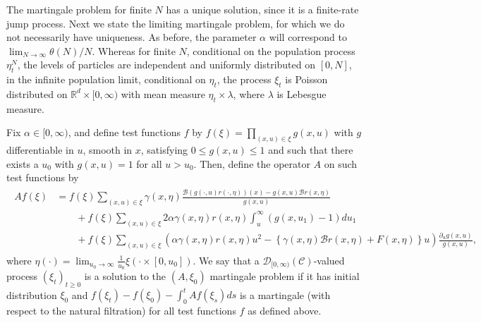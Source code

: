 \documentclass[EJP]{ejpecp} %
\newcommand{\IR}{\mathbb R}
\newcommand{\DG}{\mathcal{B}}  %
\newcommand{\lp}{\xi}              %
\begin{document}
The martingale problem for finite $N$ has a unique solution, 
since it is a finite-rate jump process.
Next we state the limiting martingale problem,
for which we do not necessarily have uniqueness.
As before, the parameter $\alpha$ will correspond to 
$\lim_{N\to\infty}\theta(N)/N$. Whereas for finite $N$, conditional
on the population process $\eta_t^N$, the levels of particles are
independent and 
uniformly distributed on $[0,N]$, in the infinite population limit, 
conditional on $\eta_t$, the process $\xi_t$ is Poisson distributed on 
$\IR^d\times [0,\infty)$ with mean measure $\eta_t\times\lambda$, where 
$\lambda$ %
is Lebesgue measure.

\begin{definition}
    \label{defn:limiting_lookdown_mgale}
    Fix $\alpha \in [0, \infty)$, and define  
    test functions $f$ by 
    $f(\xi) = \prod_{(x, u) \in \xi} g(x, u)$ 
	with $g$ differentiable in $u$, smooth in $x$, satisfying 
$0\leq g(x,u)\leq 1$ and
    such that there exists a $u_0$ with $g(x, u) = 1$ for all $u > u_0$.
    Then, define the operator $A$ on such test functions by 
    \begin{align} \begin{split} \label{eqn:limiting_lookdown_generator}
    A f(\lp)
    &=
        f(\lp)  \sum_{(x, u) \in \xi}
        \gamma(x, \eta)
            \frac{
                \DG(g(\cdot, u) r(\cdot, \eta))(x) - g(x,u) \DG r(x,\eta)
            }{
                g(x, u)
            }
    \\ &\qquad {} +
        f(\lp) \sum_{(x, u) \in \xi}
        2 \alpha \gamma(x, \eta) r(x, \eta) \int_u^\infty (g(x, u_1) - 1) du_1
    \\ &\qquad {} +
        f(\lp) \sum_{(x, u) \in \xi}
        \left(
            \alpha \gamma(x, \eta) r(x, \eta) u^2
            -
            \left\{
                \gamma(x, \eta) \DG r(x, \eta) + F(x, \eta)
            \right\} u
        \right)
        \frac{\partial_u g(x, u)}{ g(x,u) }  ,
    \end{split} \end{align}
    where $\eta(\cdot) = \lim_{u_0 \to \infty} \frac{1}{u_0} \xi(\cdot \times [0, u_0])$.
    We say that a ${\mathcal D}_{[0,\infty)}(\mathcal{C})$-valued process $(\xi_t)_{t \ge 0}$
    is a solution to the $(A, \lp_0)$ martingale problem
    if it has initial distribution $\lp_0$
    and $f(\lp_t) - f(\lp_0)-\int_0^t Af(\lp_s) ds$ is a martingale (with
respect to the natural filtration) for all 
test functions $f$
    as defined above.
\end{definition}
\end{document}
